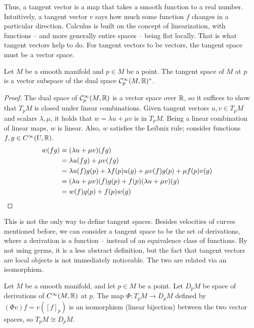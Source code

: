 \documentclass[a4paper,12pt]{article}
\begin{document}
Thus, a tangent vector is a map that takes a smooth function to a real number.
Intuitively, a tangent vector $v$ says how much some function $f$ changes in a particular direction.
Calculus is built on the concept of linearization, with functions -- and more generally entire spaces -- being flat locally.
That is what tangent vectors help to do.
For tangent vectors to be vectors, the tangent space must be a vector space.
\begin{proposition}\label{prop:tangent_space_is_vector_space}
    Let $M$ be a smooth manifold and $p \in M$ be a point.
    The tangent space of $M$ at $p$ is a vector subspace of the dual space $\mathcal{C}^\infty_p(M, \mathbb{R})^*$.
\end{proposition}
\begin{proof}
    The dual space of $\mathcal{C}^\infty_p(M, \mathbb{R})$ is a vector space over $\mathbb{R}$, so it suffices to show that $T_p M$ is closed under linear combinations.
    Given tangent vectors $u, v \in T_p M$ and scalars $\lambda, \mu$, it holds that $w = \lambda u + \mu v$ is in $T_p M$.
    Being a linear combination of linear maps, $w$ is linear.
    Also, $w$ satisfies the Leibniz rule; consider functions $f, g \in C^\infty(U, \mathbb{R})$.
    \begin{align*}
        w(fg) &= (\lambda u + \mu v)(fg) \\
        &= \lambda u(fg) + \mu v(fg) \\
        &= \lambda u(f) g(p) + \lambda f(p) u(g) + \mu v(f) g(p) + \mu f(p) v(g) \\
        &= (\lambda u + \mu v)(f) g(p) + f(p) (\lambda u + \mu v)(g) \\
        &= w(f) g(p) + f(p) w(g) \qedhere
    \end{align*}
\end{proof}
This is not the only way to define tangent spaces.
Besides velocities of curves mentioned before, we can consider a tangent space to be the set of derivations, where a derivation is a function -- instead of an equivalence class of functions.
By not using germs, it is a less abstract definition, but the fact that tangent vectors are local objects is not immediately noticeable.
The two are related via an isomorphism.
\begin{proposition}\label{prop:tangent_space_definition_equivalence}
    Let $M$ be a smooth manifold, and let $p \in M$ be a point.
    Let $D_p M$ be space of derivations of $C^\infty(M, \mathbb{R})$ at $p$.
    The map $\Phi \colon T_p M \to D_p M$ defined by $(\Phi v) f = v([f]_p)$ is an isomorphism (linear bijection) between the two vector spaces, so $T_p M \cong D_p M$.
\end{proposition}
\end{document}
